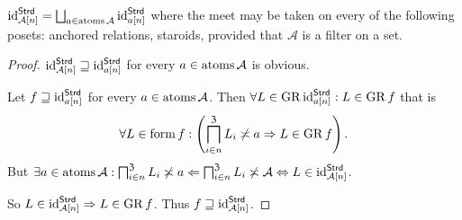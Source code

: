 \begin{prop}
$\operatorname{id}_{\mathcal{A}[n]}^{\mathsf{Strd}}=\bigsqcup_{a\in\operatorname{atoms}\mathcal{A}}\operatorname{id}_{a[n]}^{\mathsf{Strd}}$
where the meet may be taken on every of the following posets: anchored
relations, staroids, provided that $\mathcal{A}$ is a filter on a
set.\end{prop}
\begin{proof}
$\operatorname{id}_{\mathcal{A}[n]}^{\mathsf{Strd}}\sqsupseteq\operatorname{id}_{a[n]}^{\mathsf{Strd}}$
for every $a\in\operatorname{atoms}\mathcal{A}$ is obvious.

Let $f\sqsupseteq\operatorname{id}_{a[n]}^{\mathsf{Strd}}$ for every $a\in\operatorname{atoms}\mathcal{A}$.
Then $\forall L\in\operatorname{GR}\operatorname{id}_{a[n]}^{\mathsf{Strd}}:L\in\operatorname{GR} f$ that is
\[
\forall L\in\operatorname{form} f:\left(\bigsqcap_{i\in n}^{\mathfrak{Z}}L_{i}\not\asymp a\Rightarrow L\in\operatorname{GR} f\right).
\]
But $\exists a\in\operatorname{atoms}\mathcal{A}:\bigsqcap_{i\in n}^{\mathfrak{Z}}L_{i}\not\asymp a\Leftarrow\bigsqcap_{i\in n}^{\mathfrak{Z}}L_{i}\not\asymp\mathcal{A}\Leftrightarrow L\in\operatorname{id}_{\mathcal{A}[n]}^{\mathsf{Strd}}$.

So $L\in\operatorname{id}_{\mathcal{A}[n]}^{\mathsf{Strd}}\Rightarrow L\in\operatorname{GR} f$.
Thus $f\sqsupseteq\operatorname{id}_{\mathcal{A}[n]}^{\mathsf{Strd}}$.
\end{proof}

